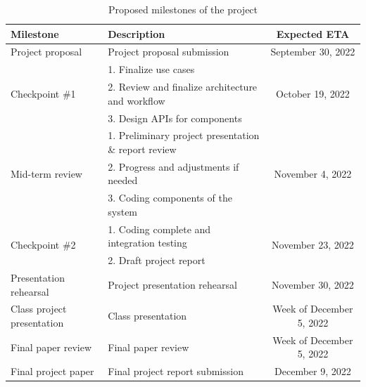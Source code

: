 \documentclass[10pt]{article}
\begin{document}
\begin{table}[H]
\small
\begin{center}
\begin{tabular}{|l|l||c|}
\hline
Milestone & Description & Expected ETA\\
\hline
\hline
Project proposal                    & Project proposal submission & September 30, 2022\\\hline
\multirow{3}{*}{Checkpoint \#1}     & 1. Finalize use cases & \multirow{3}{*}{October 19, 2022}\\
                                    & 2. Review and finalize architecture and workflow & \\
                                    & 3. Design APIs for components & \\\hline
\multirow{3}{*}{Mid-term review}    & 1. Preliminary project presentation \& report review  & \multirow{3}{*}{November 4, 2022}\\
                                    & 2. Progress and adjustments if needed & \\
                                    & 3. Coding components of the system & \\\hline
\multirow{2}{*}{Checkpoint \#2}     & 1. Coding complete and integration testing & \multirow{2}{*}{November 23, 2022}\\
                                    & 2. Draft project report & \\\hline
Presentation rehearsal              & Project presentation rehearsal & November 30, 2022\\\hline
Class project presentation          & Class presentation & Week of December 5, 2022 \\\hline
Final paper review                  & Final paper review & Week of December 5, 2022\\\hline
Final project paper                 & Final project report submission & December 9, 2022\\\hline
\end{tabular}
\caption{Proposed milestones of the project}
\label{tbl:milestones}    
\end{center}
\end{table}

\footnotesize


\end{document}
